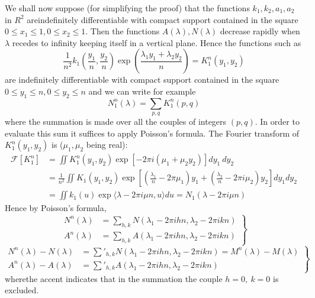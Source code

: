 We shall now suppose (for simplifying the proof) that the functions
$k_1,  k_2,  a_1, a_2$ in $R^2$ are\pageoriginale indefinitely differentiable with
compact support contained in the square $0 \leq x_1 \leq 1, 0 \leq x_2
\leq 1$. Then the functions $A(\lambda ), N(\lambda )$ decrease rapidly
when $\lambda$ recedes to infinity keeping itself in a vertical
plane. Hence the functions such as 
$$
\frac{1}{n^2} k_1 \left(\frac{y_1}{n},  \frac{y_2}{n}\right) \exp
\left(\frac{\lambda_1 y_1 + \lambda_2 y_2}{n}\right) = K^n_1 (y_1,  y_2) 
$$
are indefinitely differentiable with compact support contained in the
square $0 \leq y_1 \leq n, 0 \leq y_2 \leq n$ and we can write for
example 
$$
N^n_1 (\lambda ) = \sum_{p, q} K^n_1 (p, q)
$$
where the summation is made over all the couples of integers $(p,
q)$. In order to evaluate this sum it suffices to apply Poisson's
formula. The Fourier transform of $K^n_1 (y_1, y_2)$ is ($\mu_1,
\mu_2$ being real): 
{\fontsize{10}{12}\selectfont
\begin{align*}
\mathscr{F} [K^n_1] &= \iint K^n_1 (y_1, y_2) \exp [-2 \pi i (\mu_1 +
  \mu_2 y_2)] dy_1 ~ dy_2  \\
  & = \frac{1}{n^2} \iint  K_1 (y_1, y_2) \exp [\left(\frac{\lambda_1}{n} -
    2 \pi \mu_1 \right) y_1 + \left(\frac{\lambda_2}{n} - 2 \pi i
    \mu_2 \right) y_2] dy_1 dy_2 \\ 
  & = \iint k_1 (u)\exp \langle \lambda - 2 \pi i \mu n, u \rangle du
  = N_1 (\lambda - 2 \pi i \mu n) 
\end{align*}}\relax
Hence by Poisson's formula,
\begin{equation}
  \left.
  \begin{aligned}
    N^n(\lambda ) & = \sum^{~}_{h, k}N(\lambda_1 - 2 \pi ihn,  \lambda_2 -
    2 \pi ikn) \\ 
    A^n(\lambda ) & = \sum_{h, k} A (\lambda_1 - 2 \pi ihn,  \lambda_2
    - 2 \pi ikn) 
  \end{aligned} \tag{5}\label{part2:chap3:sec8:eq5}
  \right\} 
\end{equation}
\begin{equation*}
  \left.
  \begin{aligned}
    N^n(\lambda ) - N(\lambda ) & = \sum'_{h, k}N (\lambda_1 - 2 \pi
    ihn, \lambda_2 - 2 \pi ikn) = M^n(\lambda ) - M(\lambda ) \\ 
    A^n(\lambda ) - A (\lambda ) & = \sum'_{h, k} A (\lambda_1 - 2 \pi
    ihn, \lambda_2 - 2 \pi ikn)  
  \end{aligned} \tag{6}\label{part2:chap3:sec8:eq6}
  \right\}
\end{equation*}
where\pageoriginale the accent indicates that in the summation the couple $h=0, ~
k=0$ is excluded. 

